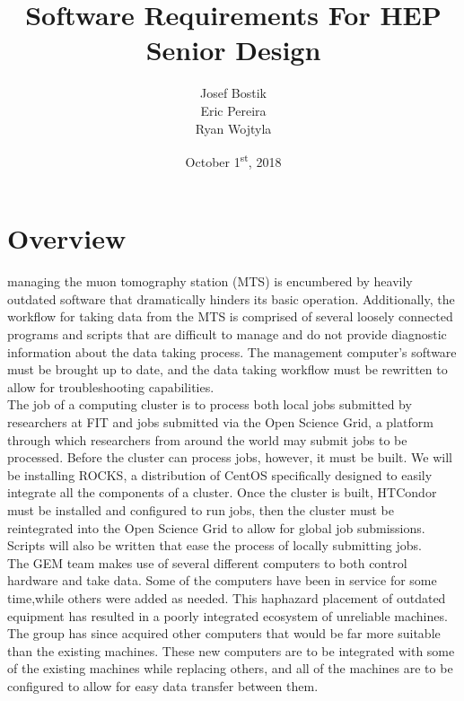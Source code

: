 \documentclass[12pt]{article}
\newcommand\tab[1][1cm]{\hspace*{#1}}
\begin{document}
\begin{titlepage}
	

\author{Josef Bostik\\
	Eric Pereira\\
	Ryan Wojtyla\\}
\date{October 1\textsuperscript{st}, 2018}
\title{Software Requirements For HEP Senior Design}
\maketitle
\end{titlepage}
\tableofcontents
\newpage {}
\section*{Overview}
managing the muon tomography station (MTS) is encumbered by heavily outdated
software that dramatically hinders its basic operation. Additionally, the
workflow for taking data from the MTS is comprised of several loosely connected
programs and scripts that are difficult to manage and do not provide diagnostic
information about the data taking process. The management computer’s software
must be brought up to date, and the data taking workflow must be rewritten to
allow for troubleshooting capabilities. \\ 
\tab The job of a computing cluster
is to process both local jobs submitted by researchers at FIT and jobs submitted
via the Open Science Grid, a platform through which researchers from around the
world may submit jobs to be processed. Before the cluster can process jobs,
however, it must be built. We will be installing ROCKS, a distribution of CentOS
specifically designed to easily integrate all the components of a cluster. Once
the cluster is built, HTCondor must be installed and configured to run jobs,
then the cluster must be reintegrated into the Open Science Grid to allow for
global job submissions. Scripts will also be written that ease the process of
locally submitting jobs. \\ 
\tab The GEM team makes use of several different
computers to both control hardware and take data. Some of the computers have
been in service for some time,while others were added as needed. This haphazard
placement of outdated equipment has resulted in a poorly integrated ecosystem of
unreliable machines. The group has since acquired other computers that would be
far more suitable than the existing machines. These new computers are to be
integrated with some of the existing machines while replacing others, and all of
the machines are to be configured to allow for easy data transfer between
them.\\
\end{document}
